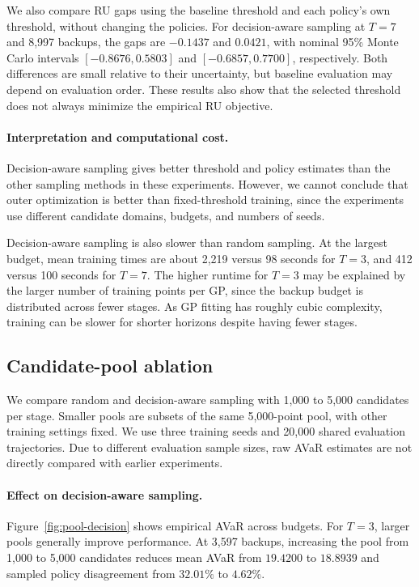 We also compare RU gaps using the baseline threshold and each policy's own threshold, without changing the policies. For decision-aware sampling at $T=7$ and 8,997 backups, the gaps are $-0.1437$ and $0.0421$, with nominal 95\% Monte Carlo intervals $[-0.8676,0.5803]$ and $[-0.6857,0.7700]$, respectively. Both differences are small relative to their uncertainty, but baseline evaluation may depend on evaluation order. These results also show that the selected threshold does not always minimize the empirical RU objective.

\paragraph{Interpretation and computational cost.}

Decision-aware sampling gives better threshold and policy estimates than the other sampling methods in these experiments. However, we cannot conclude that outer optimization is better than fixed-threshold training, since the experiments use different candidate domains, budgets, and numbers of seeds.

Decision-aware sampling is also slower than random sampling. At the largest budget, mean training times are about 2,219 versus 98 seconds for $T=3$, and 412 versus 100 seconds for $T=7$. The higher runtime for $T=3$ may be explained by the larger number of training points per GP, since the backup budget is distributed across fewer stages. As GP fitting has roughly cubic complexity, training can be slower for shorter horizons despite having fewer stages.


\subsection{Candidate-pool ablation}
\label{res:pool}

We compare random and decision-aware sampling with 1,000 to 5,000 candidates per stage. Smaller pools are subsets of the same 5,000-point pool, with other training settings fixed. We use three training seeds and 20,000 shared evaluation trajectories. Due to different evaluation sample sizes, raw AVaR estimates are not directly compared with earlier experiments.

\paragraph{Effect on decision-aware sampling.}

Figure~\ref{fig:pool-decision} shows empirical AVaR across budgets. For $T=3$, larger pools generally improve performance. At 3,597 backups, increasing the pool from 1,000 to 5,000 candidates reduces mean AVaR from $19.4200$ to $18.8939$ and sampled policy disagreement from $32.01\%$ to $4.62\%$.

